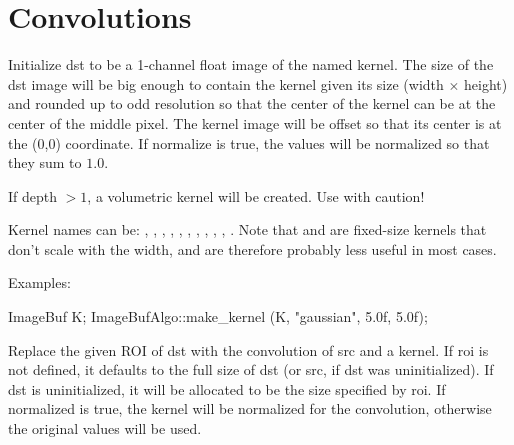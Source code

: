 \section{Convolutions}
\label{sec:iba:convolutions}

 
Initialize {\cf dst} to be a 1-channel {\cf float} image of the named kernel.
The size of the {\cf dst} image will be big enough to contain the kernel
given its size ({\cf width} $\times$ {\cf height})
and rounded up to odd resolution so
that the center of the kernel can be at the center of the middle
pixel.  The kernel image will be offset so that its center is at the
{\cf (0,0)} coordinate.  If {\cf normalize} is true, the values will be
normalized so that they sum to $1.0$.

If {\cf depth} $> 1$, a volumetric kernel will be created.  Use with
caution!

Kernel names can be: , , ,
, , , ,
, , , . Note that
 and  are fixed-size kernels that don't
scale with the width, and are therefore probably less useful in most
cases.

\smallskip
\noindent Examples:
\begin{code}
    ImageBuf K;
    ImageBufAlgo::make_kernel (K, "gaussian", 5.0f, 5.0f);
\end{code}
\apiend

 
Replace the given ROI of {\cf dst} with the convolution of {\cf src} and
a kernel.  If {\cf roi} is not defined, it defaults to the full size
of {\cf dst} (or {\cf src}, if {\cf dst} was uninitialized).
If {\cf dst} is uninitialized,
it will be allocated to be the size specified by {\cf roi}.  If 
{\cf normalized} is {\cf true}, the kernel will be normalized for the 
convolution, otherwise the original values will be used.

